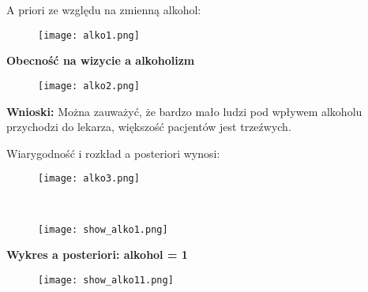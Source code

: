 \documentclass[12pt]{article}
\begin{document}
A priori ze względu na zmienną alkohol:

\begin{flushright}
\begin{figure}[ht!]
\texttt{[image: alko1.png]}
\label{fig:2}
\end{figure}
\end{flushright}
\begin{center}
\textbf{Obecność na wizycie a alkoholizm}    
\end{center}
\begin{figure}[ht!]
\begin{center}
\texttt{[image: alko2.png]}
\label{fig:2}
\end{center}
\end{figure}

\textbf{Wnioski:} Można zauważyć, że bardzo mało ludzi pod wpływem alkoholu przychodzi do lekarza, większość pacjentów jest trzeźwych.



\newpage
Wiarygodność i rozkład a posteriori wynosi:
\begin{flushright}
\begin{figure}[ht!]
\texttt{[image: alko3.png]}
\label{fig:2}
\end{figure}
\end{flushright}
\\
\begin{flushright}
\begin{figure}[ht!]
\texttt{[image: show\_alko1.png]}
\label{fig:2}
\end{figure}
\end{flushright}
\begin{center}
\textbf{Wykres a posteriori: alkohol = 1}    
\end{center}
\begin{figure}[ht!]
\begin{center}
\texttt{[image: show\_alko11.png]}
\label{fig:2}
\end{center}
\end{figure}
\newpage
\end{document}
